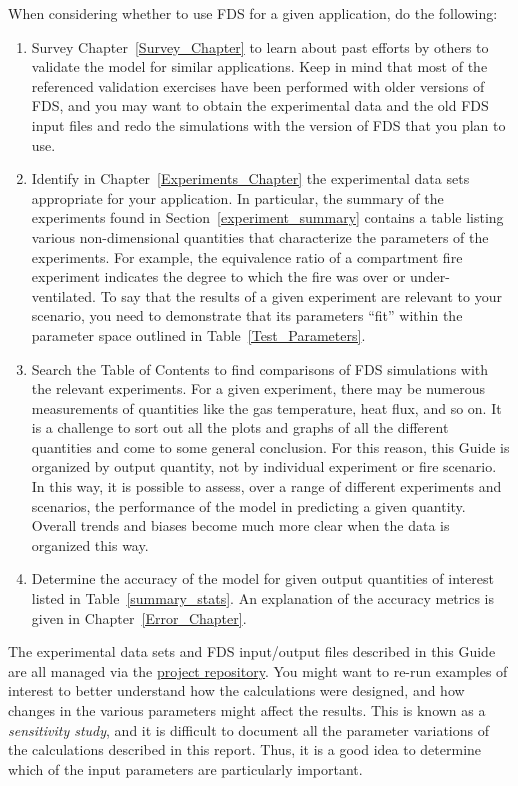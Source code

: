 When considering whether to use FDS for a given application, do the following:
\begin{enumerate}
\item Survey Chapter~\ref{Survey_Chapter} to learn about past efforts by others to validate the model for similar applications. Keep in mind that most of the referenced validation exercises have been performed with older versions of FDS, and you may want to obtain the experimental data and the old FDS input files and redo the simulations with the version of FDS that you plan to use.
\item Identify in Chapter~\ref{Experiments_Chapter} the experimental data sets appropriate for your application. In particular, the summary of the experiments found in Section~\ref{experiment_summary} contains a table listing various non-dimensional quantities that characterize the parameters of the experiments. For example, the equivalence ratio of a compartment fire experiment indicates the degree to which the fire was over or under-ventilated. To say that the results of a given experiment are relevant to your scenario, you need to demonstrate that its parameters ``fit'' within the parameter space outlined in Table~\ref{Test_Parameters}.
\item Search the Table of Contents to find comparisons of FDS simulations with the relevant experiments. For a given experiment, there may be numerous measurements of quantities like the gas temperature, heat flux, and so on. It is a challenge to sort out all the plots and graphs of all the different quantities and come to some general conclusion. For this reason, this Guide is organized by output quantity, not by individual experiment or fire scenario. In this way, it is possible to assess, over a range of different experiments and scenarios, the performance of the model in predicting a given quantity. Overall trends and biases become much more clear when the data is organized this way.
\item Determine the accuracy of the model for given output quantities of interest listed in Table~\ref{summary_stats}. An explanation of the accuracy metrics is given in Chapter~\ref{Error_Chapter}.
\end{enumerate}
The experimental data sets and FDS input/output files described in this Guide are all managed via the \href{https://github.com/firemodels/fds}{project repository}. You might want to re-run examples of interest to better understand how the calculations were designed, and how changes in the various parameters might affect the results. This is known as a {\em sensitivity study}, and it is difficult to document all the parameter variations of the calculations described in this report. Thus, it is a good idea to determine which of the input parameters are particularly important.
